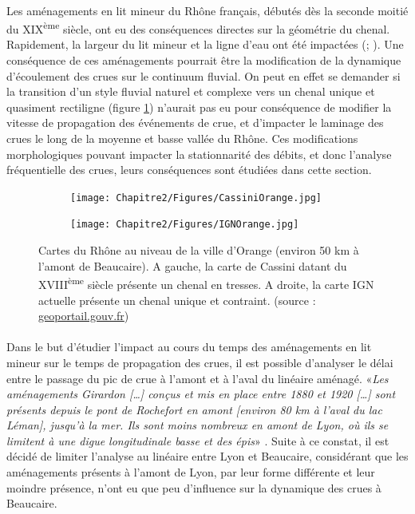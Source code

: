 	\paragraph{} Les aménagements en lit mineur du Rhône français, débutés dès la seconde moitié du XIX\textsuperscript{ème} siècle, ont eu des conséquences directes sur la géométrie du chenal. Rapidement, la largeur du lit mineur et la ligne d'eau ont été impactées (\cite{gaydou_schema_2013}; \cite{piegay_observatoire_2022}). Une conséquence de ces aménagements pourrait être la modification de la dynamique d'écoulement des crues sur le continuum fluvial. On peut en effet se demander si la transition d'un style fluvial naturel et complexe vers un chenal unique et quasiment rectiligne (figure \ref{fig:CartesChenal}) n'aurait pas eu pour conséquence de modifier la vitesse de propagation des événements de crue, et d'impacter le laminage des crues le long de la moyenne et basse vallée du Rhône. Ces modifications morphologiques pouvant impacter la stationnarité des débits, et donc l'analyse fréquentielle des crues, leurs conséquences sont étudiées dans cette section.
	
	\begin{figure}[h]
		\centering
		\begin{subfigure}{0.49\linewidth}
			\texttt{[image: Chapitre2/Figures/CassiniOrange.jpg]}
		\end{subfigure}
		\begin{subfigure}{0.49\linewidth}
			\texttt{[image: Chapitre2/Figures/IGNOrange.jpg]}
		\end{subfigure}
		\caption{Cartes du Rhône au niveau de la ville d'Orange (environ 50 km à l'amont de Beaucaire). A gauche, la carte de Cassini datant du XVIII\textsuperscript{ème} siècle présente un chenal en tresses. A droite, la carte IGN actuelle présente un chenal unique et contraint. (source : \url{geoportail.gouv.fr})}
		\label{fig:CartesChenal}
	\end{figure}
	
	\paragraph{} Dans le but d'étudier l'impact au cours du temps des aménagements en lit mineur sur le temps de propagation des crues, il est possible d'analyser le délai entre le passage du pic de crue à l'amont et à l'aval du linéaire aménagé. «\textit{Les aménagements Girardon […] conçus et mis en place entre 1880 et 1920 […] sont présents depuis le pont de Rochefort en amont [environ 80 km à l'aval du lac Léman], jusqu'à la mer. Ils sont moins nombreux en amont de Lyon, où ils se limitent à une digue longitudinale basse et des épis}» \citep{gaydou_schema_2013}. Suite à ce constat, il est décidé de limiter l'analyse au linéaire entre Lyon et Beaucaire, considérant que les aménagements présents à l'amont de Lyon, par leur forme différente et leur moindre présence, n'ont eu que peu d'influence sur la dynamique des crues à Beaucaire.
	
